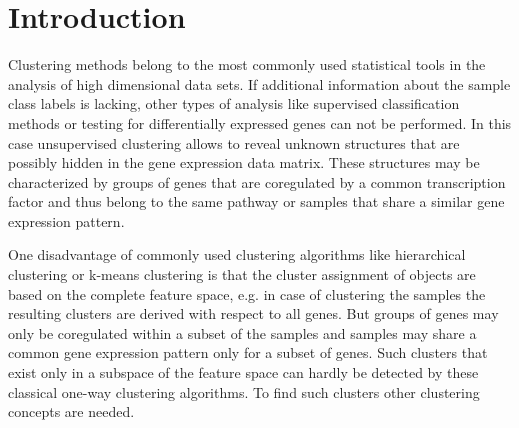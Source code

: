 \documentclass{bioinfo}
\begin{document}
\section{Introduction}
Clustering methods belong to the most commonly used statistical tools in the analysis of high dimensional data sets. If additional information about the sample class labels is lacking, other types of analysis like supervised classification methods or testing for differentially expressed genes can not be performed. In this case unsupervised clustering allows to reveal unknown structures that are possibly hidden in the gene expression data matrix. These structures may be characterized by groups of genes that are coregulated by a common transcription factor and thus belong to the same pathway or samples that share a similar gene expression pattern. 

One disadvantage of commonly used clustering algorithms like hierarchical clustering or k-means clustering is that the cluster assignment of objects are based on the complete feature space, e.g. in case of clustering the samples the resulting clusters are derived with respect to all genes. 
But groups of genes may only be coregulated within a subset of the samples and samples may share a common gene expression pattern only for a subset of genes. Such clusters that exist only in a subspace of the feature space can hardly be detected by these classical one-way clustering algorithms.
To find such clusters other clustering concepts are needed. 
\end{document}
